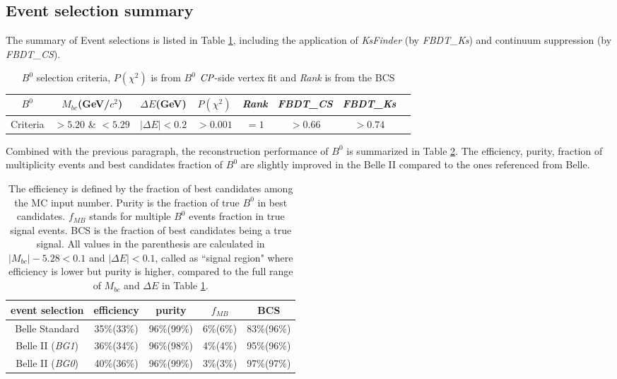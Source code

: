 \subsection{Event selection summary}
The summary of Event selections is listed in Table \ref{tab:b0select}, including the application of \textit{KsFinder} (by \textit{FBDT\_Ks}) and continuum suppression (by \textit{FBDT\_CS}).
\begin{table}[htpb]
	\centering 
	\begin{tabular}{c|c|c|c|c|c|c|c} 
		\hline
		$B^0$  & $M_{bc}$(GeV/$c^2$)& $\Delta E$(GeV) & $P(\chi^2)$ & \textit{Rank} & \textit{FBDT\_CS} & \textit{FBDT\_Ks}\\
		\hline
		Criteria & $> 5.20$ \& $< 5.29$  &  $ |\Delta E|< 0.2$ & $> 0.001$  & $=1$ & $>0.66$ & $>0.74$\\
		\hline
	\end{tabular}
	\caption{$B^0$ selection criteria, $P(\chi^2)$ is from $B^0$ $\it{CP}$-side vertex fit and \textit{Rank} is from the BCS}
	\label{tab:b0select}
\end{table}

Combined with the previous paragraph, the reconstruction performance of $B^0$ is summarized in Table \ref{tab:b0stats}. The efficiency, purity, fraction of multiplicity events and best candidates fraction of $B^0$ are slightly improved in the Belle II compared to the ones referenced from Belle.
\begin{table}[H]
	\centering
	\begin{tabular}{c|c|c|c|c}
		\hline
		event selection & efficiency & purity  & $f_{MB}$  & BCS \\
		\hline
		\hline
		Belle Standard & 35\%(33\%) & 96\%(99\%) & 6\%(6\%) & 83\%(96\%)\\
		\hline 
		Belle II (\textit{BG1}) & 36\%(34\%) & 96\%(98\%) & 4\%(4\%) & 95\%(96\%)\\
		\hline
		Belle II (\textit{BG0}) & 40\%(36\%) & 96\%(99\%) & 3\%(3\%) & 97\%(97\%)\\
		\hline
	\end{tabular}
	\caption{The efficiency is defined by the fraction of best candidates among the MC input number. Purity is the fraction of true $B^0$ in best candidates. $f_{MB}$ stands for multiple $B^0$ events fraction in true signal events. BCS is the fraction of best candidates being a true signal. All values in the parenthesis are calculated in $| M_{bc} |- 5.28 < 0.1$ and $|\Delta E| < 0.1$, called as ``signal region" where efficiency is lower but purity is higher, compared to the full range of $M_{bc}$ and $\Delta E$ in Table \ref{tab:b0select}. }
	\label{tab:b0stats}
\end{table}



